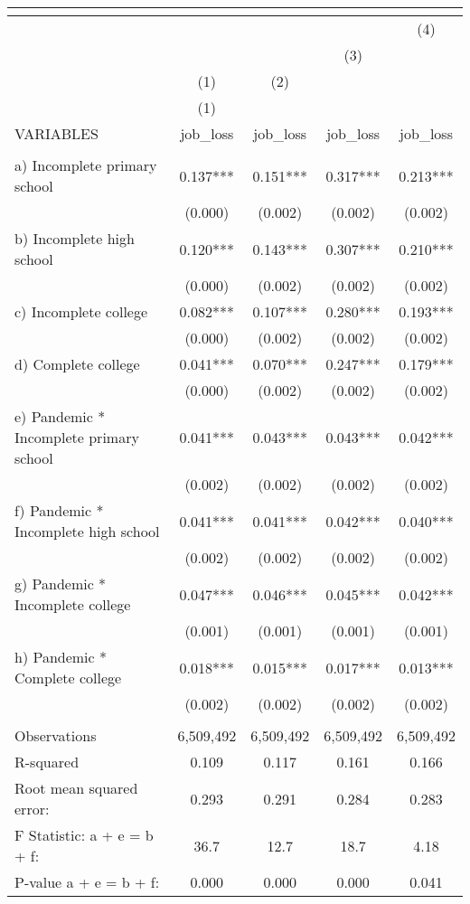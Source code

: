 \begin{tabular}{lcccc}
\multicolumn{5}{c}{} \\ \hline
 &  &  &  & (4) \\
 &  &  & (3) &  \\
 & (1) & (2) &  &  \\
 & (1) &  &  &  \\
VARIABLES & job\_loss & job\_loss & job\_loss & job\_loss \\ \hline
 &  &  &  &  \\
a) Incomplete primary school & 0.137*** & 0.151*** & 0.317*** & 0.213*** \\
 & (0.000) & (0.002) & (0.002) & (0.002) \\
b) Incomplete high school & 0.120*** & 0.143*** & 0.307*** & 0.210*** \\
 & (0.000) & (0.002) & (0.002) & (0.002) \\
c) Incomplete college & 0.082*** & 0.107*** & 0.280*** & 0.193*** \\
 & (0.000) & (0.002) & (0.002) & (0.002) \\
d) Complete college & 0.041*** & 0.070*** & 0.247*** & 0.179*** \\
 & (0.000) & (0.002) & (0.002) & (0.002) \\
e) Pandemic * Incomplete primary school & 0.041*** & 0.043*** & 0.043*** & 0.042*** \\
 & (0.002) & (0.002) & (0.002) & (0.002) \\
f) Pandemic * Incomplete high school & 0.041*** & 0.041*** & 0.042*** & 0.040*** \\
 & (0.002) & (0.002) & (0.002) & (0.002) \\
g) Pandemic * Incomplete college & 0.047*** & 0.046*** & 0.045*** & 0.042*** \\
 & (0.001) & (0.001) & (0.001) & (0.001) \\
h) Pandemic * Complete college & 0.018*** & 0.015*** & 0.017*** & 0.013*** \\
 & (0.002) & (0.002) & (0.002) & (0.002) \\
 &  &  &  &  \\
Observations & 6,509,492 & 6,509,492 & 6,509,492 & 6,509,492 \\
R-squared & 0.109 & 0.117 & 0.161 & 0.166 \\
Root mean squared error: & 0.293 & 0.291 & 0.284 & 0.283 \\
F Statistic: a + e = b + f: & 36.7 & 12.7 & 18.7 & 4.18 \\
\hspace{1mm} P-value a + e = b + f: & 0.000 & 0.000 & 0.000 & 0.041 \\

\end{tabular}
